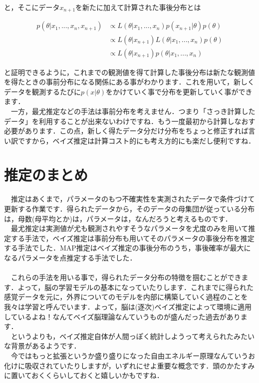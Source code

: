 \documentclass[11pt,a4paper]{ujreport} 	%
\begin{document}
と，そこにデータ$x_{n+1}$を新たに加えて計算された事後分布とは

\begin{align}
p(\theta|x_1, ..., x_{n}, x_{n+1}) &\propto L(\theta|x_1, ..., x_{n})p(x_{n+1}|\theta)p(\theta)\\ 
& \propto L(\theta|x_{n+1})L(\theta|x_1,...,x_{n}) p(\theta)\\
& \propto L(\theta|x_{n+1})p(\theta|x_1,...,x_{n})
\end{align}

と証明できるように，これまでの観測値を得て計算した事後分布は新たな観測値を得たときの事前分布になる関係にある事がわかります．これを用いて，新しくデータを観測するたびに$p(x|\theta)$をかけていく事で分布を更新していく事ができます．\\
　一方，最尤推定などの手法は事前分布を考えません．つまり「さっき計算したデータ」を利用することが出来ないわけですね．もう一度最初から計算しなおす必要があります．この点，新しく得たデータ分だけ分布をちょっと修正すれば言い訳ですから，ベイズ推定は計算コスト的にも考え方的にも楽だし便利ですね．




\section{推定のまとめ}
　推定はあくまで，パラメータのもつ不確実性を実測されたデータで条件づけて更新する作業です．得られたデータから，そのデータの母集団が従っている分布は，母数(母平均とか)は，パラメータは，なんだろうと考えるものです．\\
　最尤推定は実測値が尤も観測されやすそうなパラメータを尤度のみを用いて推定する手法で，ベイズ推定は事前分布も用いてそのパラメータの事後分布を推定する手法でした．MAP推定はベイズ推定の事後分布のうち，事後確率が最大になるパラメータを点推定する手法でした．\\
\\
　これらの手法を用いる事で，得られたデータ分布の特徴を掴むことができます．よって，脳の学習モデルの基本になっていたりします．これまでに得られた感覚データを元に，外界についてのモデルを内部に構築していく過程のことを我々は学習と呼んでいます．よって，脳は(逐次)ベイズ推定によって環境に適用しているよね！なんてベイズ脳理論なんていうものが盛んだった過去があります．\\
　というよりも，ベイズ推定自体が人間っぽく統計しようって考えられたみたいな背景があるようです．\\
　今ではもっと拡張というか盛り盛りになった自由エネルギー原理なんていうお化けに吸収されていたりしますが，いずれにせよ重要な概念です．頭のかたすみに置いておくくらいしておくと嬉しいかもですね．\\
\end{document}
